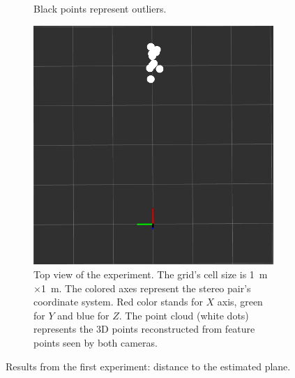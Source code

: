 \begin{figure}[ht]
\begin{subfigure}[ht]{0.49\textwidth}
{        Black points represent outliers.
    }
    \label{fig:exp_1_chart_dists}
  \end{subfigure}
  \hfill
  \begin{subfigure}[ht]{0.49\textwidth}
    \centering
    \includegraphics[width=\textwidth]{graphics/experiment_1_4m.png}
    \caption[Top view of the experiment.]{Top view of the experiment. 
    The grid's cell size is \SI{1}{\meter}$\times$\SI{1}{\meter}.
    The colored axes represent the stereo pair's coordinate system.
    Red color stands for $X$ axis, green for $Y$ and blue for $Z$.
    The point cloud (white dots) represents the 3D points reconstructed from feature points seen by both cameras.}
    \label{fig:exp_1_topview}
  \end{subfigure}
  \caption{Results from the first experiment: distance to the estimated plane.}
  \label{fig:exp_1_exp}
\end{figure}

